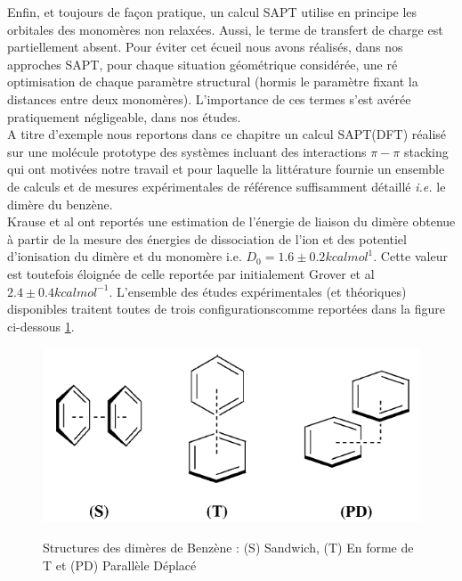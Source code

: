    					
   					Enfin, et toujours de façon pratique, un calcul SAPT utilise en principe les orbitales des monomères non relaxées. Aussi, le terme de transfert de charge est partiellement absent.
   					Pour éviter cet écueil nous avons réalisés, dans nos approches SAPT, pour chaque situation géométrique considérée, une ré optimisation de chaque paramètre structural (hormis le paramètre fixant la distances entre deux monomères). L’importance de ces termes s’est avérée pratiquement négligeable, dans nos études.\\
   					
   					
   					A titre d’exemple nous reportons dans ce chapitre un calcul SAPT(DFT) réalisé sur une molécule prototype des systèmes incluant des interactions $\pi-\pi$ stacking qui ont motivées notre travail et pour laquelle la littérature fournie un ensemble de calculs et de mesures expérimentales de référence suffisamment détaillé \textit{i.e.} le dimère du benzène. \\
   					
   					Krause et al \cite{krause1991binding} ont reportés une estimation de l’énergie de liaison du dimère obtenue à partir de la mesure  des énergies de dissociation de l'ion et des potentiel d’ionisation du dimère et du monomère i.e. $D_{0}= 1.6 \pm 0.2 kcal mol^{1}$. Cette valeur est toutefois éloignée de celle reportée par initialement Grover et al \cite{grover1987dissociation} $2.4 \pm 0.4 kcal mol^{-1}$. 
   					L’ensemble des études expérimentales (et théoriques) disponibles traitent toutes de trois configurationscomme reportées dans la figure ci-dessous \ref{figprot}.
   					
   					\begin{figure}[H]
   						\centering
   						\includegraphics[scale=0.8]{image/Prot} \label{figprot}
   						\caption[Structures du dimère de Benzène]{Structures des dimères de Benzène : (S) Sandwich, (T) En forme de T et (PD) Parallèle Déplacé}
   					\end{figure}
   					
